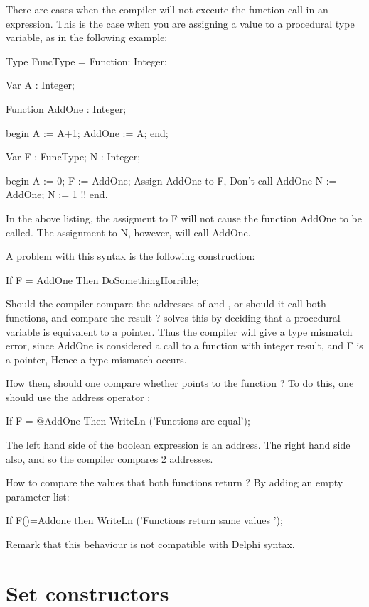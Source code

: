 \documentclass{report}
\begin{document}
There are cases when the compiler will not execute the function call in an
expression. This is the case when you are assigning a value to a procedural
type variable, as in the following example:
\begin{listing}
Type 
  FuncType = Function: Integer;

Var A : Integer;

Function AddOne : Integer;

begin
  A := A+1;
  AddOne := A;
end;

Var F : FuncType;
    N : Integer;

begin
  A := 0;
  F := AddOne; { Assign AddOne to F, Don't call AddOne}
  N := AddOne; { N := 1 !!}
end.
\end{listing}
In the above listing, the assigment to F will not cause the function AddOne
to be called. The assignment to N, however, will call AddOne.

A problem with this syntax is the following construction:
\begin{listing}
If F = AddOne Then
  DoSomethingHorrible;
\end{listing}
Should the compiler compare the addresses of  and ,
or should it call both functions, and compare the result ? \fpc solves this
by deciding that a procedural variable is equivalent to a pointer. Thus the
compiler will give a type mismatch error, since AddOne is considered a
call to a function with integer result, and F is a pointer, Hence a type
mismatch occurs.

How then, should one compare whether  points to the function
 ? To do this, one should use the address operator :
\begin{listing}
If F = @AddOne Then
  WriteLn ('Functions are equal');
\end{listing}
The left hand side of the boolean expression is an address. The right hand
side also, and so the compiler compares 2 addresses.

How to compare the values that both functions return ? By adding an empty
parameter list:
\begin{listing}
  If F()=Addone then
    WriteLn ('Functions return same values ');
\end{listing}

Remark that this behaviour is not compatible with Delphi syntax.

\section{Set constructors}
\end{document}
